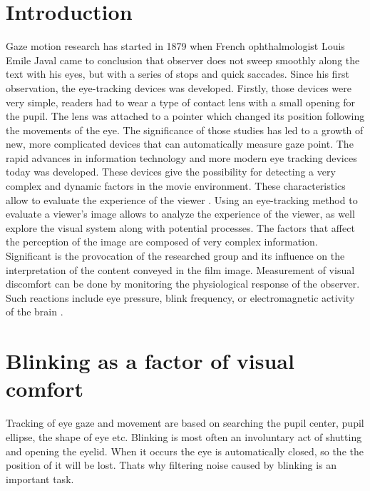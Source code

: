 \documentclass[runningheads,a4paper]{llncs}
\begin{document}
\section{Introduction}\label{sec:intro}
Gaze motion research has started in 1879 when French ophthalmologist Louis Emile Javal came to conclusion that observer does not sweep smoothly along the text with his eyes, but with a series of stops and quick saccades\cite{Winery}.  Since his first observation, the eye-tracking devices was developed. Firstly, those devices were very simple, readers had to wear a type of contact lens with a small opening for the pupil. The lens was attached to a pointer which changed its position following the movements of the eye. The significance of those studies has led to a growth of new, more complicated devices that can automatically measure gaze point. The rapid advances in information technology and more modern eye tracking devices today was developed. These devices give the possibility for detecting a very complex and dynamic factors in the movie environment. These characteristics allow to evaluate the experience of the viewer \cite{mital2011clustering}.
Using an eye-tracking method to evaluate a viewer's image allows to analyze the experience of the viewer, as well explore the visual system along with potential processes.
The factors that affect the perception of the image are composed of very complex information. Significant is the provocation of the researched group and its influence on the interpretation of the content conveyed in the film image. Measurement of visual discomfort can be done by monitoring the physiological response of the observer. Such reactions include eye pressure, blink frequency, or electromagnetic activity of the brain \cite{Fornalczyk_Napieralski_Szajerman_Wojciechowski_2015, Fornalczyk_Napieralski_Szajerman_Wojciechowski_20152}.



\section{Blinking as a factor of visual comfort}
Tracking of eye gaze and movement are based on searching the pupil center, pupil ellipse, the shape of eye etc. Blinking is most often an involuntary act of shutting and opening the eyelid. When it occurs the eye is automatically closed, so the the position of it will be lost. Thats why filtering noise caused by blinking is an important task. 
\end{document}
